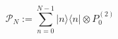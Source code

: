 \begin{equation}
 \mathcal{P}_N:=\sum_{n=0}^{N-1}|n\rangle\langle n|\otimes P_0^{(2)}
\end{equation}

